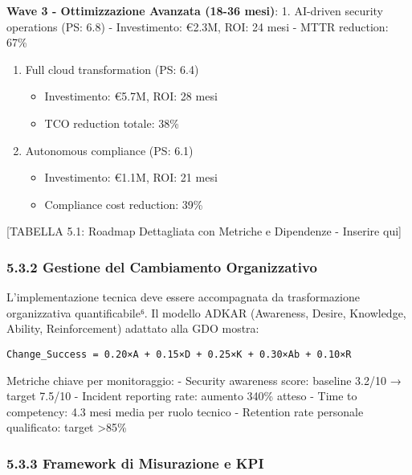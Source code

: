 \documentclass{report}
\begin{document}
\textbf{Wave 3 - Ottimizzazione Avanzata (18-36 mesi)}: 1. AI-driven
security operations (PS: 6.8) - Investimento: €2.3M, ROI: 24 mesi - MTTR
reduction: 67\%

\begin{enumerate}
\def\labelenumi{\arabic{enumi}.}
\setcounter{enumi}{1}
\tightlist
\item
  Full cloud transformation (PS: 6.4)

  \begin{itemize}
  \tightlist
  \item
    Investimento: €5.7M, ROI: 28 mesi
  \item
    TCO reduction totale: 38\%
  \end{itemize}
\item
  Autonomous compliance (PS: 6.1)

  \begin{itemize}
  \tightlist
  \item
    Investimento: €1.1M, ROI: 21 mesi
  \item
    Compliance cost reduction: 39\%
  \end{itemize}
\end{enumerate}

{[}TABELLA 5.1: Roadmap Dettagliata con Metriche e Dipendenze - Inserire
qui{]}

\subsubsection{5.3.2 Gestione del Cambiamento
Organizzativo}\label{gestione-del-cambiamento-organizzativo}

L'implementazione tecnica deve essere accompagnata da trasformazione
organizzativa quantificabile⁶. Il modello ADKAR (Awareness, Desire,
Knowledge, Ability, Reinforcement) adattato alla GDO mostra:

\begin{verbatim}
Change_Success = 0.20×A + 0.15×D + 0.25×K + 0.30×Ab + 0.10×R
\end{verbatim}

Metriche chiave per monitoraggio: - Security awareness score: baseline
3.2/10 → target 7.5/10 - Incident reporting rate: aumento 340\% atteso -
Time to competency: 4.3 mesi media per ruolo tecnico - Retention rate
personale qualificato: target \textgreater85\%

\subsubsection{5.3.3 Framework di Misurazione e
KPI}\label{framework-di-misurazione-e-kpi}
\end{document}

